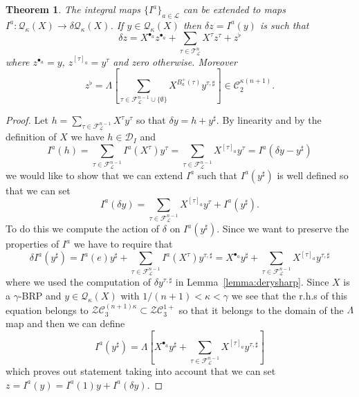 \documentclass[a4paper,11pt,reqno]{article}
\newcommand{\1}{{\bf 1}}
\newcommand{\der}{\delta}
\newcommand{\FF}{\mathcal{F}}
\newcommand{\QQ}{\mathcal{Q}}
\newcommand{\CC}{\mathcal{C}}
\newcommand{\DD}{\mathcal{D}}
\newcommand{\ZZ}{\mathcal{Z}}
\newcommand{\LL}{\mathcal{L}}
\newcommand{\cl}{\mathcal L}
\newtheorem{theorem}{Theorem}[section]
\newcommand{\TT}{\mathcal{T}}
\newcommand{\troot}{\bullet}
\begin{document}
\begin{theorem}
\label{th:controlled-integrals}
The integral maps   $\{I^a\}_{a\in\LL}$ can be extended to  maps $I^a :  \QQ_\kappa(X) \to \der \QQ_\kappa(X)$.  If $y \in \QQ_\kappa(X)$ then $\der z = I^a( y)$ is such that
\begin{equation}
  \label{eq:2}
\der z = X^{\troot_a} z^{\troot_a} +    \sum_{\tau \in \TT_\cl^{n}} X^{\tau} z^{\tau} + z^{\flat}  
\end{equation}
where $z^{\troot_a} = y$,
$z^{[\tau]_a} = y^{\tau}$
and zero otherwise.
Moreover
$$
z^\flat =\Lambda\left[ \sum_{\tau  \in \FF_\cl^{n-1}\cup\{\emptyset\}}  X^{B^+_a(\tau)}  y^{\tau,\sharp}\right] \in \CC_2^{\kappa (n+1)}.
$$ 
\end{theorem}
\begin{proof}
Let $h = \sum_{\tau \in \FF^{n-1}_\LL} X^\tau y^\tau$ so that $\der y = h + y^\sharp$. By linearity and by the definition of $X$ we have $h \in \DD_I$ and 
$$
I^a(h) =\sum_{\tau \in \FF^{n-1}_\LL} I^a(X^{\tau}) y^\tau =  \sum_{\tau \in \FF^{n-1}_\LL} X^{[\tau]_a} y^\tau = I^a(\der y - y^\sharp)
$$  
we would like to show that we can extend $I^a$ such that $I^a(y^\sharp)$ is well defined so that we can set
$$
I^a(\der y) = \sum_{\tau \in \FF^{n-1}_\LL} X^{[\tau]_a} y^\tau + I^a(y^\sharp).
$$ 
To do this we compute the action of $\der$ on $I^a(y^\sharp)$. Since we want to preserve the properties of $I^a$ we have to require that
$$
\der I^a(y^\sharp) = I^a(e) y^\sharp + \sum_{\tau \in \FF^{n-1}_\LL}I^a(X^\tau) y^{\tau,\sharp}
= X^{\troot_a} y^\sharp + \sum_{\tau \in \FF^{n-1}_\LL}X^{[\tau]_a} y^{\tau,\sharp}
$$
where we used the computation of $\der y^{\tau,\sharp}$ in Lemma~\ref{lemma:derysharp}. Since $X$ is a $\gamma$-BRP and $y \in \QQ_\kappa(X)$ with $1/(n+1)< \kappa < \gamma$ we see that the r.h.s of this equation belongs to $\ZZ\CC_3^{(n+1)\kappa} \subset \ZZ\CC_3^{1+}$ so that it belongs to the domain of the $\Lambda$ map and then we can define
$$
I^a(y^\sharp) = \Lambda \left[X^{\troot_a} y^\sharp + \sum_{\tau \in \FF^{n-1}_\LL}X^{[\tau]_a} y^{\tau,\sharp}\right]
$$
which proves out statement taking into account that we can set $z = I^a(y) = I^a(1)y
+ I^a(\der y)$.
\end{proof}
\end{document}

